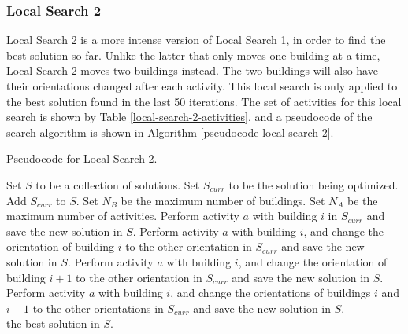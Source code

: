 \subsubsection{Local Search 2}
Local Search 2 is a more intense version of Local Search 1, in order to find the best solution so far. Unlike the latter that only moves one building at a time, Local Search 2 moves two buildings instead. The two buildings will also have their orientations changed after each activity. This local search is only applied to the best solution found in the last 50 iterations. The set of activities for this local search is shown by Table \ref{local-search-2-activities}, and a pseudocode of the search algorithm is shown in Algorithm \ref{pseudocode-local-search-2}.

\begin{algorithm}[h!]
	\caption{Pseudocode for Local Search 2.}
	\label{pseudocode-local-search-2}
	\begin{algorithmic}[1]
		\State Set $S$ to be a collection of solutions.
		\State Set $S_{curr}$ to be the solution being optimized.
		\State Add $S_{curr}$ to $S$.
		\State Set $N_{B}$ be the maximum number of buildings.
		\State Set $N_{A}$ be the maximum number of activities.
		\State Perform activity $a$ with building $i$ in $S_{curr}$ and save the new solution in $S$.
		\State Perform activity $a$ with building $i$, and change the orientation of \WRP building $i$ to the other orientation in $S_{curr}$ and save the new \WRP solution in $S$.
		\State Perform activity $a$ with building $i$, and change the orientation of \WRP building $i + 1$ to the other orientation in $S_{curr}$ and save the new \WRP solution in $S$.
		\State Perform activity $a$ with building $i$, and change the orientations of \WRP buildings $i$ and $i + 1$ to the other orientations in $S_{curr}$ and save the new \WRP solution in $S$.
		\EndFor
		\EndFor \\
		\Return the best solution in $S$.
	\end{algorithmic}
\end{algorithm}

